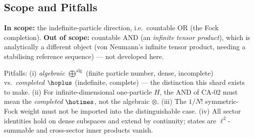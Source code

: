 \subsection{Scope and Pitfalls}

\textbf{In scope:} the indefinite-particle direction, i.e.\ countable
$\mathrm{OR}$ (the Fock completion). \textbf{Out of scope:} countable
$\mathrm{AND}$ (an \emph{infinite tensor product}), which is analytically a
different object (von Neumann's infinite tensor product, needing a stabilising
reference sequence) --- not developed here.

Pitfalls: (i) \emph{algebraic} $\bigoplus^{\mathrm{alg}}$ (finite particle number,
dense, incomplete) vs.\ \emph{completed} $\hoplus$ (indefinite, complete) --- the
distinction this shard exists to make. (ii) For infinite-dimensional one-particle
$H$, the $\mathrm{AND}$ of CA-02 must mean the \emph{completed} $\hotimes$, not the
algebraic $\otimes$. (iii) The $1/N!$ symmetric-Fock weight must not be imported
into the distinguishable case. (iv) All sector identities hold on dense subspaces
and extend by continuity; states are $\ell^2$-summable and cross-sector inner
products vanish.
